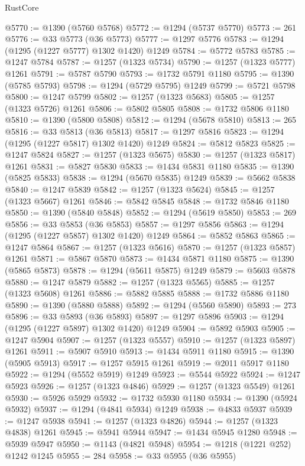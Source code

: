 \begin{lexlean}{RustCore}
\begin{coremodule}
@5770 := @1390 (@5760 @5768)
@5772 := @1294 (@5737 @5770)
@5773 := 261
@5776 := @33 @5773 (@36 @5773)
@5777 := @1297 @5776
@5783 := @1294 (@1295 (@1227 @5777) @1302 @1420) @1249
@5784 := @5772 @5783
@5785 := @1247 @5784
@5787 := @1257 (@1323 @5734)
@5790 := @1257 (@1323 @5777) @1261
@5791 := @5787 @5790
@5793 := @1732 @5791 @1180
@5795 := @1390 (@5785 @5793)
@5798 := @1294 (@5729 @5795) @1249
@5799 := @5721 @5798
@5800 := @1247 @5799
@5802 := @1257 (@1323 @5683)
@5805 := @1257 (@1323 @5726) @1261
@5806 := @5802 @5805
@5808 := @1732 @5806 @1180
@5810 := @1390 (@5800 @5808)
@5812 := @1294 (@5678 @5810)
@5813 := 265
@5816 := @33 @5813 (@36 @5813)
@5817 := @1297 @5816
@5823 := @1294 (@1295 (@1227 @5817) @1302 @1420) @1249
@5824 := @5812 @5823
@5825 := @1247 @5824
@5827 := @1257 (@1323 @5675)
@5830 := @1257 (@1323 @5817) @1261
@5831 := @5827 @5830
@5833 := @1434 @5831 @1180
@5835 := @1390 (@5825 @5833)
@5838 := @1294 (@5670 @5835) @1249
@5839 := @5662 @5838
@5840 := @1247 @5839
@5842 := @1257 (@1323 @5624)
@5845 := @1257 (@1323 @5667) @1261
@5846 := @5842 @5845
@5848 := @1732 @5846 @1180
@5850 := @1390 (@5840 @5848)
@5852 := @1294 (@5619 @5850)
@5853 := 269
@5856 := @33 @5853 (@36 @5853)
@5857 := @1297 @5856
@5863 := @1294 (@1295 (@1227 @5857) @1302 @1420) @1249
@5864 := @5852 @5863
@5865 := @1247 @5864
@5867 := @1257 (@1323 @5616)
@5870 := @1257 (@1323 @5857) @1261
@5871 := @5867 @5870
@5873 := @1434 @5871 @1180
@5875 := @1390 (@5865 @5873)
@5878 := @1294 (@5611 @5875) @1249
@5879 := @5603 @5878
@5880 := @1247 @5879
@5882 := @1257 (@1323 @5565)
@5885 := @1257 (@1323 @5608) @1261
@5886 := @5882 @5885
@5888 := @1732 @5886 @1180
@5890 := @1390 (@5880 @5888)
@5892 := @1294 (@5560 @5890)
@5893 := 273
@5896 := @33 @5893 (@36 @5893)
@5897 := @1297 @5896
@5903 := @1294 (@1295 (@1227 @5897) @1302 @1420) @1249
@5904 := @5892 @5903
@5905 := @1247 @5904
@5907 := @1257 (@1323 @5557)
@5910 := @1257 (@1323 @5897) @1261
@5911 := @5907 @5910
@5913 := @1434 @5911 @1180
@5915 := @1390 (@5905 @5913)
@5917 := @1257 @5915 @1261
@5919 := @2011 @5917 @1180
@5922 := @1294 (@5552 @5919) @1249
@5923 := @5544 @5922
@5924 := @1247 @5923
@5926 := @1257 (@1323 @4846)
@5929 := @1257 (@1323 @5549) @1261
@5930 := @5926 @5929
@5932 := @1732 @5930 @1180
@5934 := @1390 (@5924 @5932)
@5937 := @1294 (@4841 @5934) @1249
@5938 := @4833 @5937
@5939 := @1247 @5938
@5941 := @1257 (@1323 @4826)
@5944 := @1257 (@1323 @4838) @1261
@5945 := @5941 @5944
@5947 := @1434 @5945 @1280
@5948 := @5939 @5947
@5950 := @1143 (@4821 @5948)
@5954 := @1218 (@1221 @252) @1242 @1245
@5955 := 284
@5958 := @33 @5955 (@36 @5955)

\end{coremodule}
\end{lexlean}
